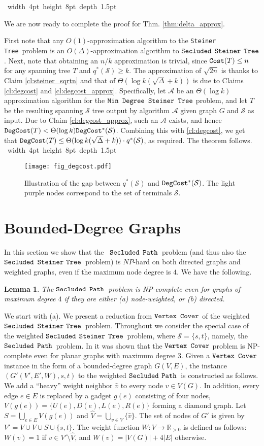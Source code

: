 \documentclass[12pt]{article}
\newtheorem{lemma}[theorem]{Lemma}
\def\Cost{\mbox{\tt Cost}}
\def\Proof{\par\noindent{\bf Proof:~}}
\def\blackslug{\hbox{\hskip 1pt \vrule width 4pt height 8pt
    depth 1.5pt \hskip 1pt}}
\def\QED{\quad\blackslug\lower 8.5pt\null\par}
\newcommand{\MAXDEG}[0]{\Delta}
\newcommand{\PS}[0]{$\mbox{\tt Secluded}$ $\mbox{\tt Steiner}$
$\mbox{\tt Tree}$}
\newcommand{\Terminals}[0]{\mathcal{S}}
\newcommand{\PP}[0]{$\mbox{\tt Secluded}$ $\mbox{\tt Path}$}
\newcommand{\Steiner}[0]{\mbox{\tt Steiner Tree}}
\newcommand{\PSDeg}[0]{\mbox{\tt Min Degree Steiner Tree}}
\newcommand{\VC}[0]{\mbox{\tt Vertex Cover}}
\def\Cost{\mbox{\tt Cost}}
\def\DegCost{\mbox{\tt DegCost}}
\def\OptDegCost{\DegCost^{*}}
\begin{document}
\QED
We are now ready to complete the proof for Thm. \ref{thm:delta_approx}.
\Proof
First note that any $O(1)$-approximation algorithm to the \Steiner\ problem is an $O(\MAXDEG)$-approximation algorithm to \PS. Next, note that obtaining an $n/k$ approximation is trivial, since $\Cost(T) \leq n$ for any spanning tree $T$ and $q^{*}(\Terminals)\geq k$.
The approximation of $\sqrt{2n}$ is thanks to Claim \ref{cl:steiner_sqrtn} and that of $\Theta(\log k (\sqrt{\MAXDEG}+k))$ is due to Claims \ref{cl:degcost} and \ref{cl:degcost_approx}. Specifically, let $\mathcal{A}$ be an $\Theta(\log k)$ approximation algorithm for the $\PSDeg$ problem, and let $T$ be the resulting spanning $\Terminals$ tree output by algorithm $\mathcal{A}$ given graph $G$ and $\Terminals$ as input. Due to Claim \ref{cl:degcost_approx}, such an $\mathcal{A}$ exists, and hence $\DegCost(T)<\Theta(\log k) \OptDegCost(\Terminals)$. Combining this with \ref{cl:degcost}, we get that $\DegCost(T) \leq \Theta(\log k (\sqrt{\MAXDEG}+k))\cdot q^{*}(\Terminals)$, as required. The theorem follows.
\QED

\begin{figure}[h!]
\begin{center}
\texttt{[image: fig\_degcost.pdf]}
\caption{ \label{fig:degcost_gap}
\sf
Illustration of the gap between $q^{*}(\Terminals)$ and $\DegCost^{*}(\Terminals)$.  The light purple nodes correspond to the set of terminals $\Terminals$.
}
\end{center}
\end{figure}

\section{Bounded-Degree Graphs}
In this section we show that the ~\PP\ problem (and thus also the \PS\ problem) is $NP$-hard on both directed graphs and weighted graphs, even if the maximum node degree is $4$. We have the following.
\begin{lemma}
\label{lem:privatepath_vc}
The \PP\ problem is NP-complete even for graphs of maximum degree $4$
if they are either (a) node-weighted, or (b) directed.
\end{lemma}
We start with (a).
We present a reduction from $\VC$ of the weighted \PS\ problem.
Throughout we consider the special case of the weighted \PS\ problem, where $\Terminals=\{s,t\}$, namely, the \PP\ problem.
In \cite{VCDeg3} it was shown that the $\VC$ problem is NP-complete even for planar graphs with maximum degree $3$. Given a $\VC$ instance in the form of a bounded-degree graph $G(V,E)$, the instance $(G'(V',E',W), s,t)$ to the weighted \PP\ is constructed as follows. We add a ``heavy'' weight neighbor $\widehat{v}$ to every node $v \in V(G)$. In addition, every edge $e \in E$ is replaced by a gadget $g(e)$ consisting of four nodes, $V(g(e))=\{U(e), D(e),L(e),R(e)\}$ forming a diamond graph. Let $S=\bigcup_{e \in E} V(g(e))$ and $\widehat{V}=\bigcup_{v \in V} \{\widehat{v}\}$. The set of nodes of $G'$ is given by $V'=V \cup \widehat{V} \cup S \cup \{s,t\}$. The weight function $W: V \to \mathbb{R}_{>0}$ is defined as follows: $W(v)=1$ if $v \in V' \setminus \widehat{V}$, and $W(v)=|V(G)|+4|E|$ otherwise.
\end{document}
